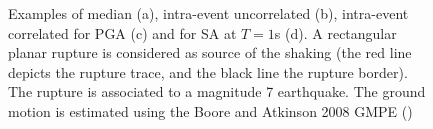 \begin{figure}[htbp]
\begin{center}
\caption{Examples of median (a), intra-event uncorrelated (b), intra-event correlated for PGA (c) and for SA at $T=1$s (d). A rectangular planar rupture is considered as source of the shaking (the red line depicts the rupture trace, and the black line the rupture border). The rupture is associated to a magnitude 7 earthquake. The ground motion is estimated using the Boore and Atkinson 2008 GMPE (\cite{boore2008})}
\label{gmfs}
\end{center}
\end{figure}

%
\clearpage\newpage
